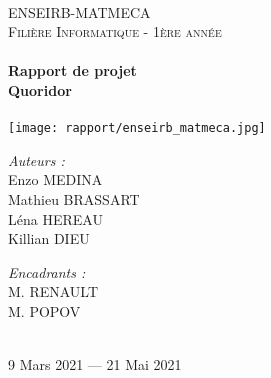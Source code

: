 \documentclass[a4paper]{article}
\begin{document}
\begin{titlepage}
    \begin{sffamily}
    \begin{center}
    
    ~\\[1.5cm]
    \textsc{\LARGE ENSEIRB-MATMECA}\\[1.5cm]
    
    \textsc{\Large Filière Informatique - 1ère année}\\[2cm]
    
    
        \hrulefill \\[0.4cm]
    { \Huge \bfseries Rapport de projet \\[0.4cm] }
    { \huge \bfseries Quoridor \\[0.4cm] }
     \hrulefill \\[2cm]
     
     \texttt{[image: rapport/enseirb\_matmeca.jpg]} \\[1cm]
     
    \begin{minipage}{0.4\textwidth}
      \begin{flushleft} \large
         \emph{Auteurs :} \\
        Enzo MEDINA\\
        Mathieu BRASSART \\
        Léna HEREAU \\
        Killian DIEU \\
      \end{flushleft}
    \end{minipage}
    \begin{minipage}{0.4\textwidth}
      \begin{flushright} \large
        \emph{Encadrants :} \\
        M. RENAULT\\
        M. POPOV \\
      \end{flushright}
    \end{minipage}
    
     ~\\[1.5cm]
    {\large 9 Mars 2021 — 21 Mai 2021}
    
    \end{center}
    \end{sffamily}
\end{titlepage}


\tableofcontents
\end{document}
